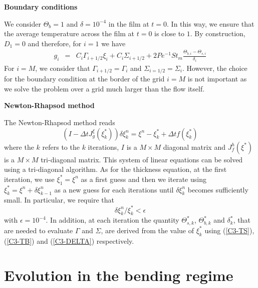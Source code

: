\vspace{.5cm} \textbf{Boundary conditions} \vspace{.5cm}

We  consider $\Theta_b  =1$  and $\delta  = 10^{-4}$  in  the film  at
$t=0$. In this way, we ensure  that the average temperature across the
film at $t=0$ is close to $1$. By construction, $D_1=0$ and therefore,
for $i=1$ we have
\begin{eqnarray}
  g_i &=& C_i\Gamma_{i+1/2}\xi_{i}+ C_i\Sigma_{i+1/2} +2Pe^{-1}St_m\frac{\Theta_{b,i}-\Theta_{s,i}}{\delta_i}
\end{eqnarray}
For   $i=M$,   we    consider   that   $\Gamma_{i+1/2}=\Gamma_i$   and
$\Sigma_{i=1/2}=\Sigma_i$.   However,  the  choice  for  the  boundary
condition at the border of the grid $i=M$ is not important as we solve
the problem over a grid much larger than the flow itself.

\vspace{.5cm} \textbf{Newton-Rhapsod method} \vspace{.5cm}

The Newton-Rhapsod method reads
\begin{equation}
  (I-\Delta tJ^{\xi}_{g}(\xi_k^*))\delta \xi_k^n=\xi^n-\xi_k^*+\Delta t f(\xi_k^*)
\end{equation}
where the  $k$ refers  to the $k$  iterations, $I$ is  a $M  \times M$
diagonal  matrix and  $J_f^h(\xi^*)$ is  a $M  \times M$  tri-diagonal
matrix.   This  system of  linear  equations  can  be solved  using  a
tri-diagonal algorithm.  As for the  thickness equation, at  the first
iteration,  we use  $\xi^*_1 =  \xi^n$ as  a first  guess and  then we
iterate using $\xi^*_k = \xi^n+\delta  \xi_{k-1}^n$ as a new guess for
each iterations  until $\delta \xi^n_{k}$ becomes  sufficiently small.
In particular, we require that
\begin{equation}
  \delta \xi^n_k/\xi^*_{k}<\epsilon
\end{equation}
with $\epsilon = 10^{-4}$. In addition, at each iteration the quantity
$\Theta^*_{s,k}$, $\Theta^*_{b,k}$ and $\delta^*_k$, that are needed to evaluate $\Gamma$ and
$\Sigma$,  are  derived from  the value of  $\xi^*_{k}$  using
(\ref{C3-TS}), (\ref{C3-TB}) and (\ref{C3-DELTA}) respectively.

\section{Evolution in the bending regime}
\label{sec:evol-bend-regime}

